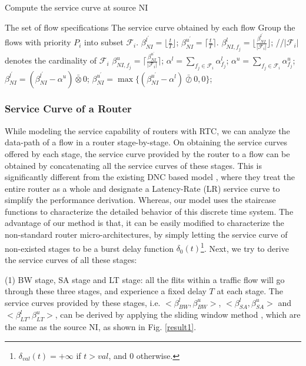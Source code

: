\documentclass[preprint]{elsarticle}
\begin{document}
\begin{algorithm}
\caption{Compute the service curve at source NI}\label{alg:scatni}
\begin{algorithmic}[1]
\Require The set of flow specifications
\Ensure The service curve obtained by each flow
\State Group the flows with priority $P_i$ into subset $\mathcal{F}_i$.
\State $\beta_{NI}^{l^\prime}=\lfloor\frac{t}{T}\rfloor$; $\beta_{NI}^{u^\prime}=\lceil\frac{t}{T}\rceil$.
        \State $\beta_{NI,f_j}^l=\lfloor\frac{\beta_{NI}^{l^\prime}}{|\mathcal{F}_i|}\rfloor$; //$|\mathcal{F}_i|$ denotes the cardinality of $\mathcal{F}_i$
        \State $\beta_{NI,f_j}^u=\lceil\frac{\beta_{NI}^{u^\prime}}{|\mathcal{F}_i|}\rceil$;
    \EndFor
    \State $\alpha^l=\sum_{f_j\in \mathcal{F}_i}\alpha^l_{f_j}$; $\alpha^u=\sum_{f_j\in \mathcal{F}_i}\alpha^u_{f_j}$;
    \State $\beta_{NI}^{l^\prime}=(\beta_{NI}^{l^\prime}-\alpha^u)\bar{\otimes}0$; $\beta_{NI}^{u^\prime}=\max\{(\beta_{NI}^{u^\prime}-\alpha^l)\bar{\oslash}0,0\}$;
\EndFor
\end{algorithmic}
\end{algorithm}

\subsubsection{Service Curve of a Router}\label{router}
While modeling the service capability of routers with RTC, we can analyze the data-path of a flow in a router stage-by-stage. On obtaining the service curves offered by each stage, the service curve provided by the router to a flow can be obtained by concatenating all the service curves of these stages. This is significantly different from the existing DNC based model \cite{qian2009analysis,Qian489900}, where they treat the entire router as a whole and designate a Latency-Rate (LR) service curve \cite{Boudec2001Network} to simplify the performance derivation. Whereas, our model uses the staircase functions to characterize the detailed behavior of this discrete time system. The advantage of our method is that, it can be easily modified to characterize the non-standard router micro-architectures, by simply letting the service curve of non-existed stages to be a burst delay function $\delta_0(t)$\footnote{$\delta_{val}(t)=+\infty$ if $t>val$, and 0 otherwise.}. Next, we try to derive the service curves of all these stages:

(1) BW stage, SA stage and LT stage: all the flits within a traffic flow will go through these three stages, and experience a fixed delay $T$ at each stage. The service curves provided by these stages, i.e. $<\beta^l_{BW},\beta^u_{BW}>$, $<\beta^l_{SA},\beta^u_{SA}>$ and $<\beta^l_{LT},\beta^u_{LT}>$, can be derived by applying the sliding window method \cite{1253607}, which are the same as the source NI, as shown in Fig. \ref{result1}.
\end{document}
